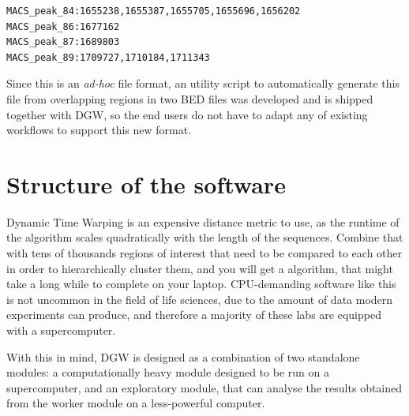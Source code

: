\documentclass[parskip]{cs4rep}
\begin{document}
\begin{verbatim}
MACS_peak_84:1655238,1655387,1655705,1655696,1656202
MACS_peak_86:1677162
MACS_peak_87:1689803
MACS_peak_89:1709727,1710184,1711343
\end{verbatim}

Since this is an \emph{ad-hoc} file format, an utility script to automatically generate this file from overlapping regions in two BED files was developed and is shipped together with DGW, so the end users do not have to adapt any of existing workflows to support this new format.

\section{Structure of the software}
Dynamic Time Warping is an expensive distance metric to use, as the runtime of the algorithm scales quadratically with the length of the sequences. Combine that with tens of thousands regions of interest  that need to be compared to each other in order to hierarchically cluster them, and you will get a algorithm, that might take a long while to complete on your laptop. CPU-demanding software like this is not uncommon in the field of life sciences, due to the amount of data modern experiments can produce, and therefore a majority of these labs are equipped with a supercomputer. 

With this in mind, DGW is designed as a combination of two standalone modules: a computationally heavy module designed to be run on a supercomputer, and an exploratory module, that can analyse the results obtained from the worker module on a less-powerful computer.
\end{document}
